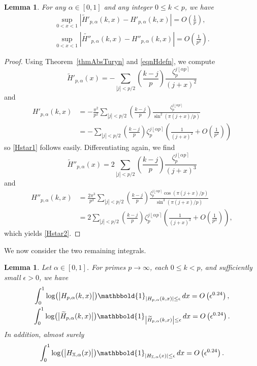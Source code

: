 \documentclass[reqno]{amsart}
\newtheorem{lemma}[theorem]{Lemma}
\numberwithin{equation}{section}
\numberwithin{table}{section}
\numberwithin{figure}{section}
\newcommand{\leg}[2]{\left(\frac{#1}{#2}\right)}
\newcommand{\abs}[1]{\left\lvert#1\right\rvert}
\newcommand{\round}[1]{\left\lfloor#1\right\rceil}
\begin{document}
\begin{lemma}\label{lemHstar}
For any $\alpha\in[0,1]$ and any integer $0\leq k<p$, we have
\begin{gather}\label{Hstar1}
\sup_{0<x<1} \abs{\widetilde{H}'_{p,\alpha}(k,x) - H'_{p,\alpha}(k,x)} = O\left(\frac{1}{p}\right),\\\label{Hstar2}
\sup_{0<x<1} \abs{\widetilde{H''}_{p,\alpha}(k,x) - H''_{p,\alpha}(k,x)} = O\left(\frac{1}{p^2}\right).
\end{gather}
\end{lemma}

\begin{proof}
Using Theorem~\ref{thmAbsTuryn} and \eqref{eqnHdefn}, we compute
\[
\widetilde{H}'_{p,\alpha}(x) = -\sum_{\abs{j}<p/2} \leg{k-j}{p} \frac{\zeta_p^{j\round{\alpha p}}}{(j+x)^2}
\]
and
\begin{align*}
H'_{p,\alpha}(k,x) &=
-\frac{\pi^2}{p^2}\sum_{\abs{j}<p/2} \leg{k-j}{p} \frac{\zeta_p^{j\round{\alpha p}}}{\sin^2(\pi(j+x)/p)}\\
&= -\sum_{\abs{j}<p/2} \leg{k-j}{p} \zeta_p^{j\round{\alpha p}} \left(\frac{1}{(j+x)^2} + O\left(\frac{1}{p^2}\right)\right)
\end{align*}
so \eqref{Hstar1} follows easily.
Differentiating again, we find
\[
\widetilde{H}''_{p,\alpha}(x) = 2\sum_{\abs{j}<p/2} \leg{k-j}{p} \frac{\zeta_p^{j\round{\alpha p}}}{(j+x)^3}
\]
and
\begin{align*}
H''_{p,\alpha}(k,x) &=
\frac{2\pi^3}{p^3}\sum_{\abs{j}<p/2} \leg{k-j}{p} \frac{\zeta_p^{j\round{\alpha p}}\cos(\pi(j+x)/p)}{\sin^3(\pi(j+x)/p)}\\
&= 2\sum_{\abs{j}<p/2} \leg{k-j}{p} \zeta_p^{j\round{\alpha p}} \left(\frac{1}{(j+x)^3} + O\left(\frac{1}{p^3}\right)\right),
\end{align*}
which yields \eqref{Hstar2}.
\end{proof}

We now consider the two remaining integrals.

\begin{lemma}\label{lemSmallValsInt}
Let $\alpha\in[0,1]$.
For primes $p\to\infty$, each $0\leq k<p$, and sufficiently small $\epsilon>0$, we have
\begin{gather}\label{eqnSmallH}
\int_0^1 \log\bigl(\big| H_{p,\alpha}(k,x)\big|\bigr) \mathbbold{1}_{\abs{H_{p,\alpha}(k,x)}\leq\epsilon}\, dx = O\left(\epsilon^{0.24}\right),\\\label{eqnsmallwtH}
\int_0^1 \log\bigl(\big|\widetilde{H}_{p,\alpha}(k,x)\big|\bigr) \mathbbold{1}_{\abs{\widetilde{H}_{p,\alpha}(k,x)}\leq\epsilon}\, dx = O\left(\epsilon^{0.24}\right).
\end{gather}
In addition, almost surely
\begin{equation}\label{eqnSmallHX}
\int_0^1 \log\bigl(\big| H_{\mathbb{X},\alpha}(x)\big|\bigr) \mathbbold{1}_{\abs{H_{\mathbb{X},\alpha}(x)}\leq\epsilon}\, dx = O\left(\epsilon^{0.24}\right).
\end{equation}
\end{lemma}
\end{document}
